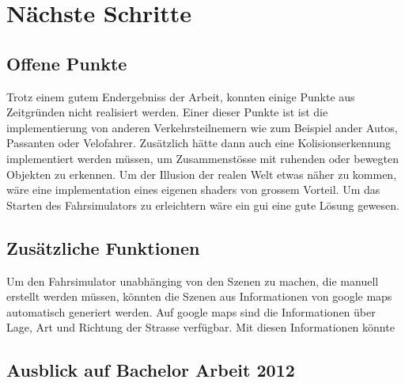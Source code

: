 \section{Nächste Schritte}
\subsection{Offene Punkte}
Trotz einem gutem Endergebniss der Arbeit, konnten einige Punkte aus Zeitgründen nicht realisiert werden. Einer dieser Punkte ist ist die implementierung von anderen Verkehrsteilnemern wie zum Beispiel ander Autos, Passanten oder Velofahrer. Zusätzlich hätte dann auch eine Kolisionserkennung implementiert werden müssen, um Zusammenstösse mit ruhenden oder bewegten Objekten zu erkennen. Um der Illusion der realen Welt etwas näher zu kommen, wäre eine implementation eines eigenen \glspl{shader} von grossem Vorteil. Um das Starten des Fahrsimulators zu erleichtern wäre ein \gls{gui} eine gute Lösung gewesen. 
\subsection{Zusätzliche Funktionen}
Um den Fahrsimulator unabhänging von den Szenen zu machen, die manuell erstellt werden müssen, könnten die Szenen aus Informationen von google maps automatisch generiert werden. Auf google maps sind die Informationen über Lage, Art und Richtung der Strasse verfügbar. Mit diesen Informationen könnte 
\subsection{Ausblick auf Bachelor Arbeit 2012}